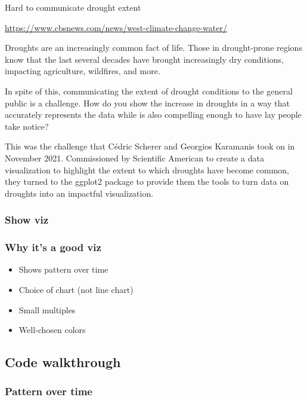 \documentclass[
]{book}
\providecommand{\tightlist}{%
  \setlength{\itemsep}{0pt}\setlength{\parskip}{0pt}}
\begin{document}
Hard to communicate drought extent

\url{https://www.cbsnews.com/news/west-climate-change-water/}

Droughts are an increasingly common fact of life. Those in drought-prone regions know that the last several decades have brought increasingly dry conditions, impacting agriculture, wildfires, and more.

In spite of this, communicating the extent of drought conditions to the general public is a challenge. How do you show the increase in droughts in a way that accurately represents the data while is also compelling enough to have lay people take notice?

This was the challenge that Cédric Scherer and Georgios Karamanis took on in November 2021. Commissioned by Scientific American to create a data visualization to highlight the extent to which droughts have become common, they turned to the ggplot2 package to provide them the tools to turn data on droughts into an impactful visualization.

\hypertarget{show-viz}{%
\subsubsection*{Show viz}\label{show-viz}}

\hypertarget{why-its-a-good-viz}{%
\subsubsection*{Why it's a good viz}\label{why-its-a-good-viz}}

\begin{itemize}
\tightlist
\item
  Shows pattern over time
\item
  Choice of chart (not line chart)
\item
  Small multiples
\item
  Well-chosen colors
\end{itemize}

\hypertarget{code-walkthrough}{%
\subsection*{Code walkthrough}\label{code-walkthrough}}

\hypertarget{pattern-over-time}{%
\subsubsection*{Pattern over time}\label{pattern-over-time}}
\end{document}
